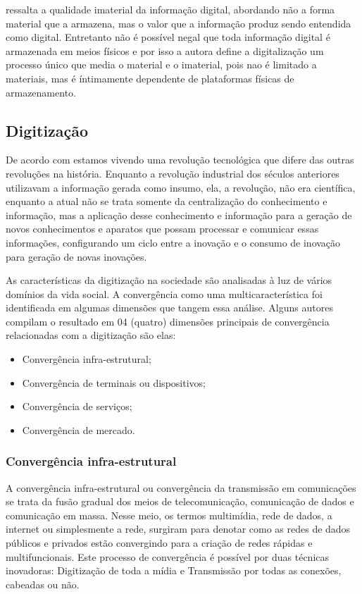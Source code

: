 \cite[p.~312]{manoff2006} ressalta a qualidade imaterial da informação digital, abordando não a forma material que a armazena, mas o valor que a informação produz sendo entendida como digital. Entretanto não é possível negal que toda informação digital é armazenada em meios físicos e por isso a autora define a digitalização um processo único que media o material e o imaterial, pois nao é limitado a materiais, mas é íntimamente dependente de plataformas físicas de armazenamento.

\subsection{Digitização}

De acordo com \cite{castells2010} estamos vivendo uma revolução tecnológica que difere das outras revoluções na história. Enquanto a revolução industrial dos séculos anteriores utilizavam a informação gerada como insumo, ela, a revolução, não era científica, enquanto a atual não se trata somente da centralização do conhecimento e informação, mas a aplicação desse conhecimento e informação para a geração de novos conhecimentos e aparatos que possam processar e comunicar essas informações, configurando um ciclo entre a inovação e o consumo de inovação para geração de novas inovações.

As características da digitização na sociedade são analisadas à luz de vários domínios da vida social. A convergência como uma multicaracterística foi identificada em algumas dimensões que tangem essa análise. Alguns autores compilam o resultado em 04 (quatro) dimensões principais de convergência relacionadas com a digitização são elas:
\begin{itemize}
	\item{Convergência infra-estrutural;}
	\item{Convergência de terminais ou dispositivos;}
	\item{Convergência de serviços;}
	\item{Convergência de mercado.}
\end{itemize}

\subsubsection{Convergência infra-estrutural}
A convergência infra-estrutural ou convergência da transmissão em comunicações \cite{vandijk2006} se trata da fusão gradual dos meios de telecomunicação, comunicação de dados e comunicação em massa. Nesse meio, os termos multimídia, rede de dados, a internet ou simplesmente a rede, surgiram para denotar como as redes de dados públicos e privados estão convergindo para a criação de redes rápidas e multifuncionais. Este processo de convergência é possível por duas técnicas inovadoras: Digitização de toda a mídia e Transmissão por todas as conexões, cabeadas ou não.


